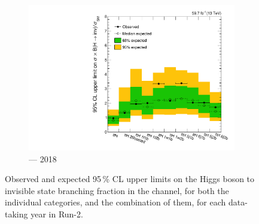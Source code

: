 \begin{figure}[htbp]
    \begin{subfigure}[b]{0.49\textwidth}
        \includegraphics[width=\textwidth]{chapters/higgstoinv/figures/limits/ttH/limit_2018_ttH.pdf}
        \caption{\ttH --- 2018}
    \end{subfigure}
    \caption[Observed and expected 95\,\% CL upper limits on the Higgs boson to invisible state branching fraction in the \ttH channel, for both the individual categories, and the combination of them, for each data-taking year in Run-2]{Observed and expected 95\,\% CL upper limits on the Higgs boson to invisible state branching fraction in the \ttH channel, for both the individual categories, and the combination of them, for each data-taking year in Run-2.}
    \label{fig:htoinv_limit_ttH_per_year}
\end{figure}

